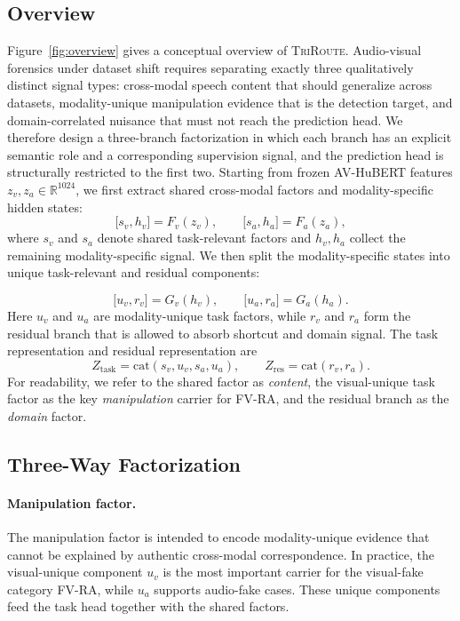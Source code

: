 \documentclass{article}
\newcommand{\method}{\textsc{TriRoute}}
\newcommand{\R}{\mathbb{R}}
\begin{document}
\subsection{Overview}

Figure~\ref{fig:overview} gives a conceptual overview of \method. Audio-visual forensics under dataset shift requires separating exactly three qualitatively distinct signal types: cross-modal speech content that should generalize across datasets, modality-unique manipulation evidence that is the detection target, and domain-correlated nuisance that must not reach the prediction head. We therefore design a three-branch factorization in which each branch has an explicit semantic role and a corresponding supervision signal, and the prediction head is structurally restricted to the first two. Starting from frozen AV-HuBERT features $z_v, z_a \in \R^{1024}$, we first extract shared cross-modal factors and modality-specific hidden states:
\begin{equation}
\big[s_v, h_v\big] = F_v(z_v), \qquad \big[s_a, h_a\big] = F_a(z_a),
\end{equation}
where $s_v$ and $s_a$ denote shared task-relevant factors and $h_v, h_a$ collect the remaining modality-specific signal. We then split the modality-specific states into unique task-relevant and residual components:

\begin{equation}
\big[u_v, r_v\big] = G_v(h_v), \qquad \big[u_a, r_a\big] = G_a(h_a).
\end{equation}
Here $u_v$ and $u_a$ are modality-unique task factors, while $r_v$ and $r_a$ form the residual branch that is allowed to absorb shortcut and domain signal. The task representation and residual representation are
\begin{equation}
Z_{\mathrm{task}} = \mathrm{cat}(s_v, u_v, s_a, u_a), \qquad
Z_{\mathrm{res}} = \mathrm{cat}(r_v, r_a).
\end{equation}
For readability, we refer to the shared factor as \emph{content}, the visual-unique task factor as the key \emph{manipulation} carrier for FV-RA, and the residual branch as the \emph{domain} factor.

\subsection{Three-Way Factorization}

\paragraph{Manipulation factor.}
The manipulation factor is intended to encode modality-unique evidence that cannot be explained by authentic cross-modal correspondence. In practice, the visual-unique component $u_v$ is the most important carrier for the visual-fake category FV-RA, while $u_a$ supports audio-fake cases. These unique components feed the task head together with the shared factors.
\end{document}
